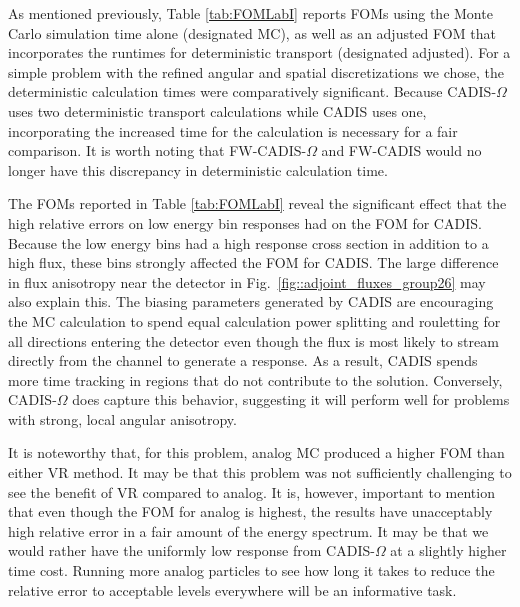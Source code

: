 \documentclass[12pt]{article}
\begin{document}
As mentioned previously, Table \ref{tab:FOMLabI} reports FOMs using the Monte Carlo simulation time alone (designated MC), as well as an adjusted FOM that incorporates the runtimes for deterministic transport (designated adjusted). For a simple problem with the refined angular and spatial discretizations we chose, the deterministic calculation times were comparatively significant.
Because CADIS-$\Omega$ uses two deterministic transport calculations while CADIS uses one, incorporating the increased time for the calculation is necessary for a fair comparison.
It is worth noting that FW-CADIS-$\Omega$ and FW-CADIS would no longer have this discrepancy in deterministic calculation time.

The FOMs reported in Table \ref{tab:FOMLabI} reveal the significant effect that the high relative errors on low energy bin responses had on the FOM for CADIS. Because the low energy bins had a high response cross section in addition to a high flux, these bins strongly affected the FOM for CADIS. The large difference in flux anisotropy near the detector in Fig.~\ref{fig::adjoint_fluxes_group26} may also explain this. The biasing parameters generated by CADIS are encouraging the MC calculation to spend equal calculation power splitting and rouletting for all directions entering the detector even though the flux is most likely to stream directly from the channel to generate a response. As a result, CADIS spends more time tracking in regions that do not contribute to the solution. Conversely, CADIS-$\Omega$ does capture this behavior, suggesting it will perform well for problems with strong, local angular anisotropy.  

It is noteworthy that, for this problem, analog MC produced a higher FOM than either VR method. 
It may be that this problem was not sufficiently challenging to see the benefit of VR compared to analog. 
It is, however, important to mention that even though the FOM for analog is highest, the results have unacceptably high relative error in a fair amount of the energy spectrum. 
It may be that we would rather have the uniformly low response from CADIS-$\Omega$ at a slightly higher time cost.
Running more analog particles to see how long it takes to reduce the relative error to acceptable levels everywhere will be an informative task. 
\end{document}
